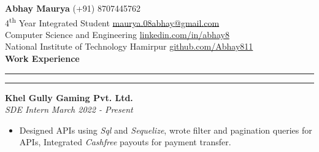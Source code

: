 \documentclass[11pt]{article}
\author{Abhay Maurya}
\begin{document}
	\LARGE{\textbf{Abhay Maurya}}
	\small
	\hfill
        (+91) 8707445762 \\
    4\textsuperscript{th} Year Integrated Student
    \hfill
        \href{mailto:maurya.08abhay@gmail.com}{\color{blue}maurya.08abhay@gmail.com}\\
    \hfill
        Computer Science and Engineering
    \hfill
        \href{https://www.linkedin.com/in/abhay8/}{\color{blue}linkedin.com/in/abhay8}\\
    \hfill
    National Institute of Technology Hamirpur
    \hfill
     	\href{https://github.com/Abhay811}{\color{blue}github.com/Abhay811}\\
    
    \vspace{4pt}
    \textbf{\large{Work Experience}}
    	\vspace{5pt}
    	\hrule \hrule
    	\vspace{4pt}
		\textbf{Khel Gully Gaming Pvt. Ltd.}
		\href{https://drive.google.com/file/d/1pzh4hYnkCkqSkFvYFnbP_ma4imH4uvEk/view?usp=sharing}{\color{blue}}
		\hfill
		\\
		\textit{SDE Intern}
		\hfill
		\textit{March 2022 - Present}
		\vspace{-2pt}
		\begin{itemize}
			\setlength{\itemsep}{0pt}
			\setlength{\parskip}{0pt}
			\setlength{\parsep}{0pt}
			\item Designed APIs using \textit{Sql} and \textit{Sequelize}, wrote filter and pagination queries for APIs, Integrated \textit{Cashfree} payouts for payment transfer.
		\end{itemize}
    	
\end{document}
